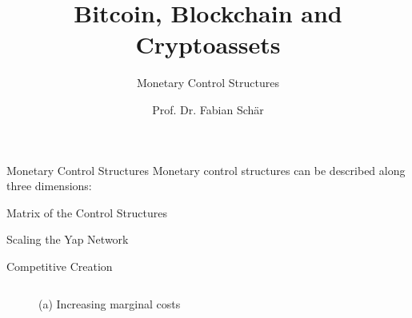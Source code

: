 \documentclass[handout]{beamer}
\title{Bitcoin, Blockchain and Cryptoassets}
\subtitle{Monetary Control Structures}
\author{Prof. Dr. Fabian Schär}
\institute{University of Basel}
\begin{document}
\thispagestyle{empty}
\begin{frame}[noframenumbering]
	\titlepage
\end{frame}

\begin{frame}{Monetary Control Structures}
	Monetary control structures can be described along three dimensions:
	\vspace{1.5em}
	\begin{figure}
		
	\end{figure}
\end{frame}

\begin{frame}{Matrix of the Control Structures}
	\begin{figure}
		
	\end{figure}
\end{frame}

\begin{frame}{Scaling the Yap Network}
	\begin{figure}
			
	\end{figure}
	\vspace{1.5em}
\end{frame}

\begin{frame}{Competitive Creation}
	\begin{columns}
		\begin{column}{0.5\textwidth}
			\begin{figure}
				
				\caption*{(a) Increasing marginal costs}
			\end{figure}
		\end{column}
		\begin{column}{0.5\textwidth}
			\begin{figure}
			\end{figure}
		\end{column}
	\end{columns}
\end{frame}
\end{document}

